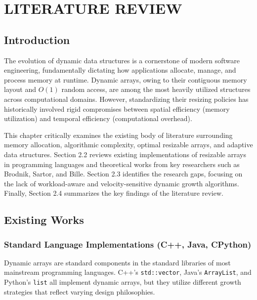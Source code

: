 \chapter{LITERATURE REVIEW}

\section{Introduction}
The evolution of dynamic data structures is a cornerstone of modern software 
engineering, fundamentally dictating how applications allocate, manage, and 
process memory at runtime. Dynamic arrays, owing to their contiguous memory 
layout and $O(1)$ random access, are among the most heavily utilized structures 
across computational domains. However, standardizing their resizing policies 
has historically involved rigid compromises between spatial efficiency (memory 
utilization) and temporal efficiency (computational overhead). 

This chapter critically examines the existing body of literature surrounding 
memory allocation, algorithmic complexity, optimal resizable arrays, and 
adaptive data structures. Section 2.2 reviews existing implementations of 
resizable arrays in programming languages and theoretical works from key 
researchers such as Brodnik, Sartor, and Bille. Section 2.3 identifies the 
research gaps, focusing on the lack of workload-aware and velocity-sensitive 
dynamic growth algorithms. Finally, Section 2.4 summarizes the key findings of 
the literature review.

\section{Existing Works}

\subsection{Standard Language Implementations (C++, Java, CPython)}
Dynamic arrays are standard components in the standard libraries of most 
mainstream programming languages. C++'s \texttt{std::vector}, Java's 
\texttt{ArrayList}, and Python's \texttt{list} all implement dynamic arrays, but 
they utilize different growth strategies that reflect varying design philosophies.

